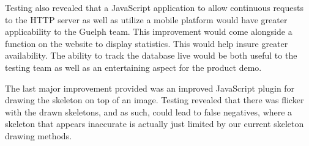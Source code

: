 \documentclass{scrreprt}
\begin{document}
Testing also revealed that a JavaScript application to allow continuous requests
to the HTTP server as well as utilize a mobile platform would have greater
applicability to the Guelph team. This improvement would come alongside a
function on the website to display statistics. This would help insure greater
availability. The ability to track the database live would be both useful to
the testing team as well as an entertaining aspect for the product demo.

The last major improvement provided was an improved JavaScript plugin
for drawing the skeleton on top of an image. Testing revealed that there was
flicker with the drawn skeletons, and as such, could lead to false negatives,
where a skeleton that appears inaccurate is actually just limited by our
current skeleton drawing methods.
\end{document}
